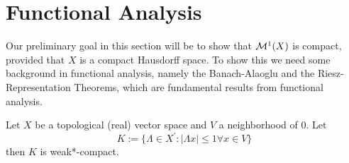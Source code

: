 \section{Functional Analysis}
Our preliminary goal in this section will be to show that $\mathcal{M}^1(X)$ is compact, provided that $X$ is a compact Hausdorff space. To show this we need some background in functional analysis, namely the Banach-Alaoglu and the Riesz-Representation Theorems, which are fundamental results from functional analysis.

\begin{theorem}\label{thm:banach-alaoglu}
	Let $X$ be a topological (real) vector space and $V$ a neighborhood of $0$. Let 
	\[
	K:=\{\Lambda\in X^\prime\colon |\Lambda x|\leq 1 \forall x\in V\}
	\]
	then $K$ is weak*-compact.
\end{theorem}

